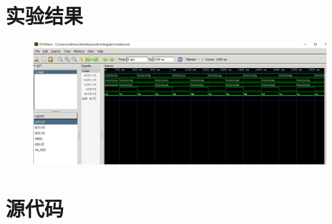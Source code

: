 \documentclass[UTF8]{ctexart}
\begin{document}
\section{实验结果}

\begin{figure}[H]
  \centering
  \includegraphics[width=1\textwidth]{reg.png}
\end{figure}



\section{源代码}
\end{document}
